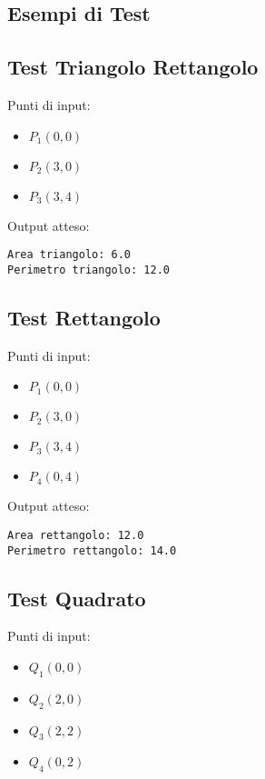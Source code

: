 \documentclass{article}
\begin{document}
\begin{multicols}{2}


\section{Esempi di Test}

\subsection{Test Triangolo Rettangolo}
Punti di input:
\begin{itemize}
\item \( P_1(0, 0) \)
\item \( P_2(3, 0) \)
\item \( P_3(3, 4) \)
\end{itemize}

Output atteso:
\begin{verbatim}
Area triangolo: 6.0
Perimetro triangolo: 12.0
\end{verbatim}

\subsection{Test Rettangolo}
Punti di input:
\begin{itemize}
\item \( P_1(0, 0) \)
\item \( P_2(3, 0) \)
\item \( P_3(3, 4) \)
\item \( P_4(0, 4) \)
\end{itemize}

Output atteso:
\begin{verbatim}
Area rettangolo: 12.0
Perimetro rettangolo: 14.0
\end{verbatim}

\vspace{1cm} %
\subsection{Test Quadrato}
Punti di input:
\begin{itemize}
\item \( Q_1(0, 0) \)

    \item \( Q_2(2, 0) \)
    
    \item \( Q_3(2, 2) \)
    \item \( Q_4(0, 2) \)
\end{itemize}


\end{multicols}
\end{document}
